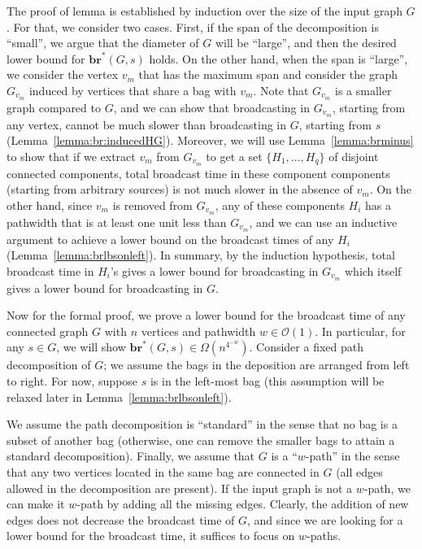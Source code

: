 \documentclass[letterpaper,11pt]{article}
\newcommand{\bropt}{{\boldsymbol{br}^*}}
\newcommand{\oh}{\mathcal{O}}
\newcommand{\pwidth}{w}
\begin{document}
The proof of lemma is established by induction over the size of the input graph $G$. For that, we consider two cases. First, if the span of the decomposition is ``small'', we argue that the diameter of $G$ will be ``large'', and then the desired lower bound for $\bropt(G,s)$ holds.
On the other hand, when the span is ``large'', we consider the vertex $v_m$ that has the maximum span and  
consider the graph $G_{v_m}$ induced by vertices that share a bag with $v_m$. Note that $G_{v_m}$ is a smaller graph compared to $G$, and we can show that broadcasting in $G_{v_m}$, starting from any vertex, cannot be much slower than broadcasting in $G$, starting from $s$ (Lemma~\ref{lemma:br:inducedHG}). 
Moreover, we will use Lemma~\ref{lemma:brminus} to show that if we extract $v_m$ from $G_{v_m}$ to get a set $\{H_1,\ldots, H_q\}$ of disjoint connected components, total broadcast time in these component components (starting from arbitrary sources) is not much slower in the absence of $v_m$. On the other hand, since $v_m$ is removed from $G_{v_m}$, any of these components $H_i$ has a pathwidth that is at least one unit less than $G_{v_m}$, and we can use an inductive argument to achieve a lower bound on the broadcast times of any $H_i$ (Lemma~\ref{lemma:brlbsonleft}). In summary, by the induction hypothesis, total broadcast time in $H_i$'s gives a lower bound for broadcasting in $G_{v_m}$ which itself gives a lower bound for broadcasting in $G$. 


Now for the formal proof, we prove a lower bound for the broadcast time of any connected graph $G$ with $n$ vertices and pathwidth $\pwidth \in \oh(1)$. In particular, for any $s\in G$, we will show $\bropt(G,s) \in \Omega(n^{4^{-\pwidth}})$.
Consider a fixed path decomposition of $G$; we assume the bags in the deposition are arranged from left to right. For now, suppose $s$ is in the left-most bag (this assumption will be relaxed later in Lemma~\ref{lemma:brlbsonleft}). 

We assume the path decomposition is ``standard'' in the sense that no bag is a subset of another bag (otherwise, one can remove the smaller bags to attain a standard decomposition). Finally, we assume that $G$ is a ``$\pwidth$-path'' in the sense that any two vertices located in the same bag are connected in $G$ (all edges allowed in the decomposition are present). If the input graph is not a $\pwidth$-path, we can make it $\pwidth$-path by adding all the missing edges. Clearly, the addition of new edges does not decrease the broadcast time of $G$, and since we are looking for a lower bound for the broadcast time, it suffices to focus on $\pwidth$-paths. 
\end{document}
